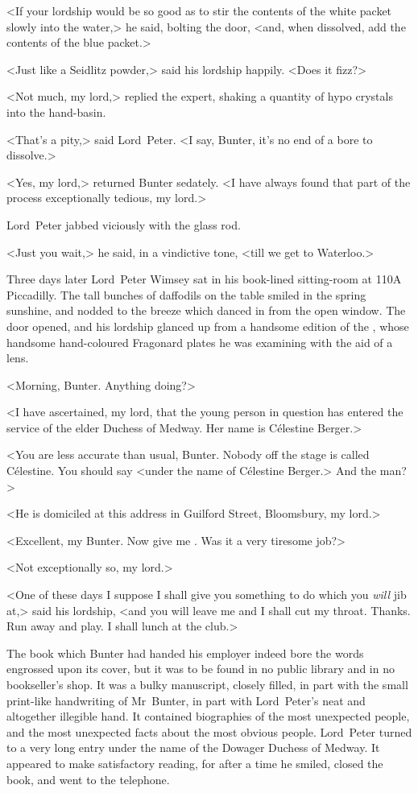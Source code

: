 <If your lordship would be so good as to stir the contents of the white packet slowly into the water,> he said, bolting the door, <and, when dissolved, add the contents of the blue packet.>

<Just like a Seidlitz powder,> said his lordship happily. <Does it fizz?>

<Not much, my lord,> replied the expert, shaking a quantity of hypo crystals into the hand-basin.

<That's a pity,> said Lord~Peter. <I say, Bunter, it's no end of a bore to dissolve.>

<Yes, my lord,> returned Bunter sedately. <I have always found that part of the process exceptionally tedious, my lord.>

Lord~Peter jabbed viciously with the glass rod.

<Just you wait,> he said, in a vindictive tone, <till we get to Waterloo.>

\divider
Three days later Lord~Peter Wimsey sat in his book-lined sitting-room at 110A Piccadilly. The tall bunches of daffodils on the table smiled in the spring sunshine, and nodded to the breeze which danced in from the open window. The door opened, and his lordship glanced up from a handsome edition of the , whose handsome hand-coloured Fragonard plates he was examining with the aid of a lens.

<Morning, Bunter. Anything doing?>

<I have ascertained, my lord, that the young person in question has entered the service of the elder Duchess of Medway. Her name is Célestine Berger.>

<You are less accurate than usual, Bunter. Nobody off the stage is called Célestine. You should say <under the name of Célestine Berger.> And the man?>

<He is domiciled at this address in Guilford Street, Bloomsbury, my lord.>

<Excellent, my Bunter. Now give me . Was it a very tiresome job?>

<Not exceptionally so, my lord.>

<One of these days I suppose I shall give you something to do which you \emph{will} jib at,> said his lordship, <and you will leave me and I shall cut my throat. Thanks. Run away and play. I shall lunch at the club.>

The book which Bunter had handed his employer indeed bore the words  engrossed upon its cover, but it was to be found in no public library and in no bookseller's shop. It was a bulky manuscript, closely filled, in part with the small print-like handwriting of Mr~Bunter, in part with Lord~Peter's neat and altogether illegible hand. It contained biographies of the most unexpected people, and the most unexpected facts about the most obvious people. Lord~Peter turned to a very long entry under the name of the Dowager Duchess of Medway. It appeared to make satisfactory reading, for after a time he smiled, closed the book, and went to the telephone.

